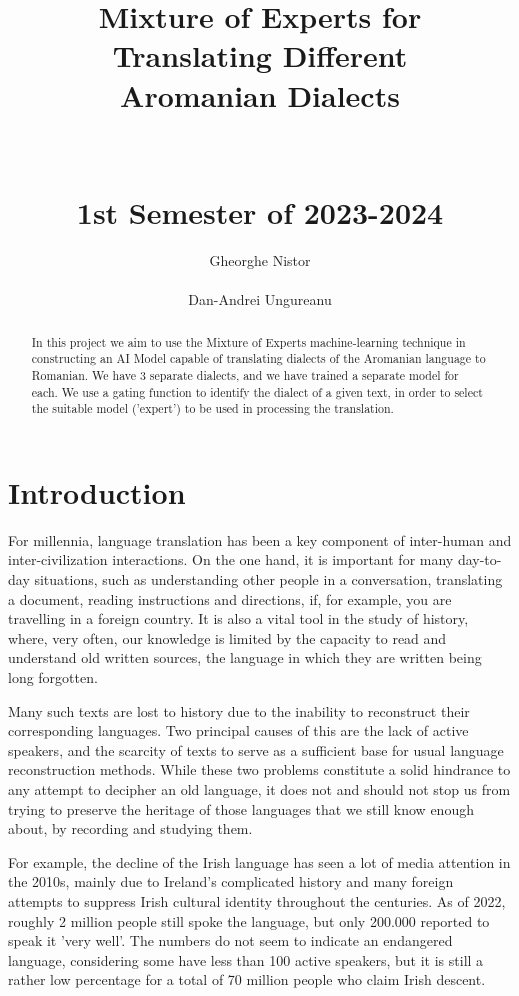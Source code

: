 \documentclass[11pt]{article}
\title{Mixture of Experts for \\ Translating Different \\
Aromanian Dialects \\
		\hfill \\
		\hfill \\
		\small{1st Semester of 2023-2024}}
\author{Gheorghe Nistor \\
  \textt{gheorghe.nistor@s.unibuc.ro} \\\And
  Dan-Andrei Ungureanu \\
  \textt{dan-andrei.ungureanu@s.unibuc.ro}
    }
\begin{document}
\maketitle
\begin{abstract}
In this project we aim to use the Mixture of Experts machine-learning technique in constructing an AI Model capable of translating dialects of the Aromanian language to Romanian. We have 3 separate dialects, and we have trained a separate model for each. We use a gating function to identify the dialect of a given text, in order to select the suitable model ('expert') to be used in processing the translation.
\end{abstract}


\section{Introduction}
\label{section:intro}

For millennia, language translation has been a key component of inter-human and inter-civilization interactions. On the one hand, it is important for many day-to-day situations, such as understanding other people in a conversation, translating a document, reading instructions and directions, if, for example, you are travelling in a foreign country. It is also a vital tool in the study of history, where, very often, our knowledge is limited by the capacity to read and understand old written sources, the language in which they are written being long forgotten. 

Many such texts are lost to history due to the inability to reconstruct their corresponding languages. Two principal causes of this are the lack of active speakers, and the scarcity of texts to serve as a sufficient base for usual language reconstruction methods. While these two problems constitute a solid hindrance to any attempt to decipher an old language, it does not and should not stop us from trying to preserve the heritage of those languages that we still know enough about, by recording and studying them.

For example, the decline of the Irish language has seen a lot of media attention in the 2010s, mainly due to Ireland's complicated history and many foreign attempts to suppress Irish cultural identity throughout the centuries. As of 2022, roughly 2 million people still spoke the language, but only 200.000 reported to speak it 'very well'. The numbers do not seem to indicate an endangered language, considering some have less than 100 active speakers, but it is still a rather low percentage for a total of 70 million people who claim Irish descent.
\end{document}

